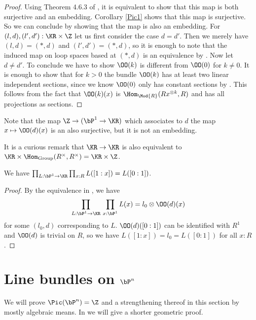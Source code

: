 \begin{proof}
  Using Theorem 4.6.3 of \cite{hott}, it is equivalent to show that this map is both surjective and an embedding.
  Corollary \ref{Pic1} shows that this map is surjective.
  So we can conclude by showing that the map is also an embedding.
  For $(l,d),(l',d'):\KR\times\Z$ let us first consider the case $d=d'$. 
  Then we merely have $(l,d)=(\ast,d)$ and $(l',d')=(\ast,d)$,
  so it is enough to note that the induced map on loop spaces based at $(\ast,d)$ is an equivalence by .
  Now let $d\neq d'$. To conclude we have to show $\OO(k)$ is different from $\OO(0)$ for $k\neq 0$.
  It is enough to show that for $k>0$ the bundle $\OO(k)$ has at least two linear independent sections,
  since we know $\OO(0)$ only has constant sections by .
  This follows from the fact that $\OO(k)(x)$ is $\Hom_{\Mod{R}}(Rx^{\otimes k},R)$ and has all projections as sections.
\end{proof}

Note that the map $\Z\rightarrow (\bP^1\rightarrow \KR)$ which
associates to $d$ the map $x\mapsto \OO(d)(x)$ is an also surjective, but it is not an embedding.

 It is a curious remark that $\KR\rightarrow \KR$ is also equivalent
 to $\KR\times \Hom_{\mathrm{Group}}(R^\times,R^\times) = \KR\times\Z$.

\begin{corollary}\label{Matthias1}
  We have $\prod_{L:\bP^1\rightarrow \KR}\prod_{x:R}L([1:x]) = L([0:1])$.
\end{corollary}

\begin{proof}
  By the equivalence in , we have
  \[ \prod_{L:\bP^1\to \KR} \,\prod_{x : \bP^1}  L(x)=l_0\otimes \OO(d)(x) \]
  for some $(l_0,d)$ corresponding to $L$.
  $\OO(d)([0:1])$ can be identified with $R^1$ and $\OO(d)$ is trivial on $R$,
  so we have $L([1:x])=l_0=L([0:1])$ for all $x:R$.
\end{proof}

\section{Line bundles on $\bP^n$}
We will prove $\Pic(\bP^n)=\Z$ and a strengthening thereof in this section by mostly algebraic means.
In  we will give a shorter geometric proof.


